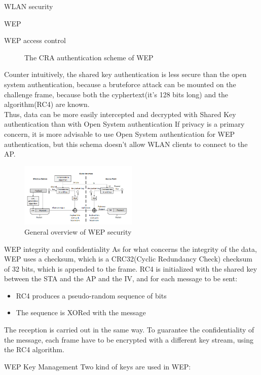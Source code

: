 \begin{section}{WLAN security}
\begin{subsection}{WEP}
\begin{subsubsection}{WEP access control}
\begin{figure}[h]
        \caption{The CRA authentication scheme of WEP}
      \end{figure}
      Counter intuitively, the shared key authentication is less secure than the open system
      authentication, because a bruteforce attack can be mounted on the challenge frame, because both 
      the cyphertext(it's 128 bits long) and the algorithm(RC4) are known.\\
      Thus, data can be more easily intercepted and decrypted with Shared Key authentication than 
      with Open System authentication
      If privacy is a primary concern, it is more advisable to use Open System authentication for WEP
      authentication, but this schema doesn't allow WLAN clients to connect to the AP.

      \begin{figure}[h]
        \centering
        \includegraphics[width=0.5\textwidth]{img/wireless/WEP security.png}
        \caption{General overview of WEP security}
      \end{figure}
    \end{subsubsection}
    \begin{subsubsection}{WEP integrity and confidentiality}
      As for what concerns the integrity of the data, WEP uses a checksum, which is a CRC32(Cyclic
      Redundancy Check) checksum of 32 bits, which is appended to the frame.
      RC4 is initialized with the shared key between the STA and the AP and the IV, and for each 
      message to be sent: 
      \begin{itemize}
        \item RC4 produces a pseudo-random sequence of bits
        \item The sequence is XORed with the message
      \end{itemize}
      The reception is carried out in the same way. To guarantee the confidentiality of the message,
      each frame have to be encrypted with a different key stream, using the RC4 algorithm.
    \end{subsubsection}
    \begin{subsubsection}{WEP Key Management}
      Two kind of keys are used in WEP:

\end{subsubsection}
\end{subsection}
\end{section}
